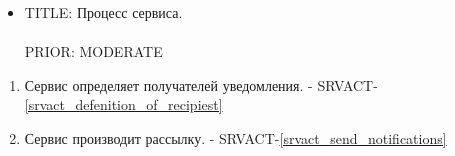         \begin{itemize}

             \item {
               TITLE: Процесс сервиса.\\
               \\
               PRIOR: MODERATE\\
             }

             \end{itemize}

        \begin{alg} \label{alg_notofocation_service_processing} \mbox{}

             \begin{enumerate}

               \item Сервис определяет получателей уведомления. - SRVACT-\ref{srvact_defenition_of_recipiest}

               \item Сервис производит рассылку. - SRVACT-\ref{srvact_send_notifications}

             \end{enumerate}

             \end{alg}

